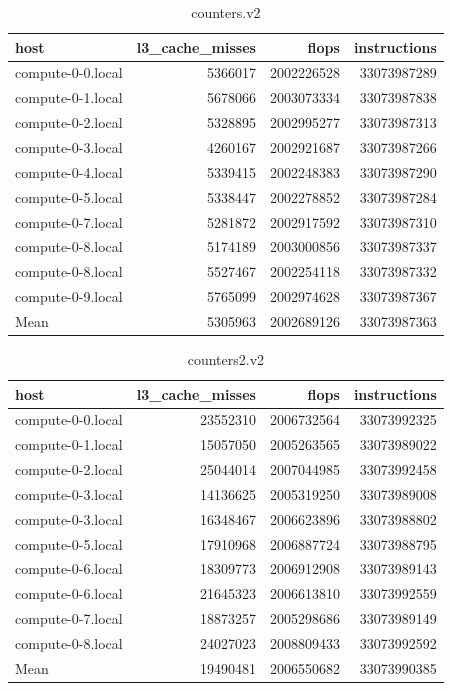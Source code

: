 \documentclass[12pt]{article}
\begin{document}
\begin{table}[h!]
	\centering
	\begin{tabular}{|l|r|r|r|}
		\hline
		host & l3\_cache\_misses & flops & instructions \\
		\hline
		compute-0-0.local & 5366017 & 2002226528 & 33073987289 \\
		compute-0-1.local & 5678066 & 2003073334 & 33073987838 \\
		compute-0-2.local & 5328895 & 2002995277 & 33073987313 \\
		compute-0-3.local & 4260167 & 2002921687 & 33073987266 \\
		compute-0-4.local & 5339415 & 2002248383 & 33073987290 \\
		compute-0-5.local & 5338447 & 2002278852 & 33073987284 \\
		compute-0-7.local & 5281872 & 2002917592 & 33073987310 \\
		compute-0-8.local & 5174189 & 2003000856 & 33073987337 \\
		compute-0-8.local & 5527467 & 2002254118 & 33073987332 \\
		compute-0-9.local & 5765099 & 2002974628 & 33073987367 \\
		\hline
		\hline
		Mean & 5305963 & 2002689126 & 33073987363 \\
		\hline
	\end{tabular}
	\caption{counters.v2}
	\label{tab:countersv2}
\end{table}

\begin{table}[h!]
	\centering
	\begin{tabular}{|l|r|r|r|}
		\hline
		host & l3\_cache\_misses & flops & instructions \\
		\hline
		compute-0-0.local & 23552310 & 2006732564 & 33073992325 \\
		\hline
		compute-0-1.local & 15057050 & 2005263565 & 33073989022 \\
		compute-0-2.local & 25044014 & 2007044985 & 33073992458 \\
		compute-0-3.local & 14136625 & 2005319250 & 33073989008 \\
		compute-0-3.local & 16348467 & 2006623896 & 33073988802 \\
		compute-0-5.local & 17910968 & 2006887724 & 33073988795 \\
		compute-0-6.local & 18309773 & 2006912908 & 33073989143 \\
		compute-0-6.local & 21645323 & 2006613810 & 33073992559 \\
		compute-0-7.local & 18873257 & 2005298686 & 33073989149 \\
		compute-0-8.local & 24027023 & 2008809433 & 33073992592 \\
		\hline
		\hline
		Mean & 19490481 & 2006550682 & 33073990385 \\
		\hline
	\end{tabular}
	\caption{counters2.v2}
	\label{tab:counters2v2}
\end{table}
\end{document}
